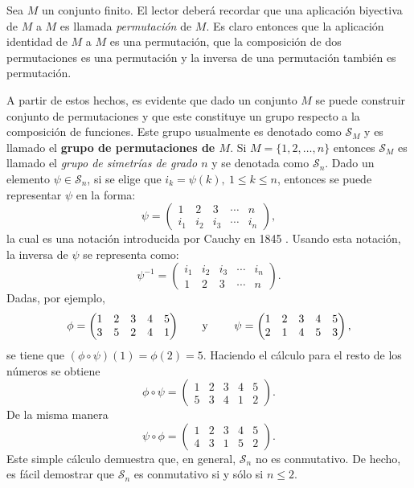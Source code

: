 \begin{ejemplo}\label{ejemplo:simetrias}
Sea $M$ un conjunto finito. El lector deberá recordar que una aplicación biyectiva de $M$ a $M$ es llamada \textit{permutación} de $M$. Es claro entonces que la aplicación identidad de $M$ a $M$ es una permutación, que la composición de dos permutaciones es una permutación y la inversa de una permutación también es permutación. 

A partir de estos hechos, es evidente que dado un conjunto $M$ se puede construir conjunto de permutaciones y que este constituye un grupo respecto a la composición de funciones. Este grupo usualmente es denotado como $\mathcal{S}_M$ y es llamado el \textbf{grupo de permutaciones de $M$}. 
Si $M = \{  1,2,\dots, n \}$ entonces $\mathcal{S}_M$ es llamado el \textit{grupo de simetrías de grado $n$} y se denotada como $\mathcal{S}_n$. Dado un elemento $\psi \in \mathcal{S}_n$, si se elige que $i_k = \psi (k), \ 1 \leq k \leq n$, entonces se puede representar $\psi$ en la forma:
\[ \psi = \begin{pmatrix}
1 & 2 & 3 & \cdots & n \\
i_1 & i_2 & i_3 & \cdots & i_n
\end{pmatrix}, \]
la cual es una notación introducida por Cauchy en 1845 \cite[vol 1, p. 64-90]{bib:Cauchy}. Usando esta notación, la inversa de $\psi$ se representa como: \[ \psi^{-1} = \begin{pmatrix}
i_1 & i_2 & i_3 & \cdots & i_n \\
1 & 2 & 3 & \cdots & n
\end{pmatrix}.
 \]
 Dadas, por ejemplo, \[ \phi = \begin{pmatrix}
 1 & 2 & 3 & 4 & 5 \\
 3 & 5 & 2 & 4 & 1
 \end{pmatrix} \mbox{\qquad y \qquad } \psi = \begin{pmatrix}
 1 & 2 & 3 & 4 & 5 \\
  2 & 1 & 4 & 5 & 3
 \end{pmatrix}, \]
 se tiene que $(\phi \circ \psi)(1) = \phi(2) = 5$. Haciendo el cálculo para el resto de los números se obtiene \[ \phi \circ \psi = \begin{pmatrix}
 1 & 2 & 3 & 4 & 5 \\
  5 & 3 & 4 & 1 & 2
 \end{pmatrix}. \]
 De la misma manera \[ \psi \circ \phi = \begin{pmatrix}
 1 & 2 & 3 & 4 & 5 \\
  4 & 3 & 1 & 5 & 2
 \end{pmatrix}. \]
 Este simple cálculo demuestra que, en general, $\mathcal{S}_n$ no es conmutativo. De hecho, es fácil demostrar que $\mathcal{S}_n$ es conmutativo si y sólo si $n \leq 2$. 
\end{ejemplo}
